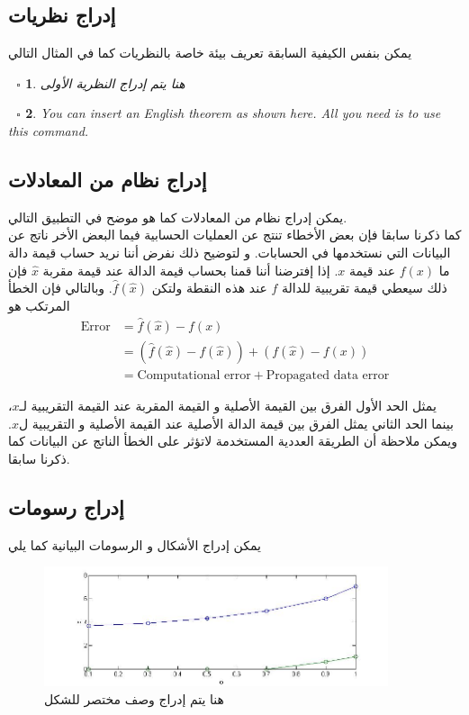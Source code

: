 \documentclass[a4 paper]{report}
\theoremstyle{mystyle}
\newtheorem{theorem}{$\:\:\:\square $ \arabicfonttt{\underline{\large{نظرية}}}}[chapter]
\theoremstyle{Excercises}
\newcommand{\eng}{\textenglish}  %
\begin{document}
\subsection{إدراج نظريات}
يمكن بنفس الكيفية السابقة تعريف بيئة خاصة بالنظريات كما في المثال التالي
\begin{theorem}\label{theorem1}
  هنا يتم إدراج النظرية الأولى
\end{theorem}

\begin{theorem}\label{theorem2}
\eng{You can insert an English theorem as shown here. All you need is to use this command.}
\end{theorem}

\subsection{إدراج نظام من المعادلات}
يمكن إدراج نظام من المعادلات كما هو موضح في التطبيق التالي. \\

كما ذكرنا سابقا فإن بعض الأخطاء تنتج عن العمليات الحسابية فيما البعض الأخر ناتج عن البيانات التي نستخدمها في الحسابات.  و لتوضيح ذلك نفرض أننا نريد حساب قيمة دالة ما $f(x)$ عند قيمة $x$.  إذا إفترضنا أننا قمنا بحساب قيمة الدالة عند قيمة مقربة $\hat{x}$ فإن ذلك سيعطي قيمة تقريبية للدالة $f$ عند هذه النقطة ولتكن $\hat{f}(\hat{x})$. وبالتالي فإن الخطأ المرتكب هو
\begin{align}
  \text{Error} & = \hat{f}(\hat{x})  - f(x) \\
\nonumber                     & = (\hat{f}(\hat{x}) - f(\hat{x}) ) + (f(\hat{x}) -f(x))\\
\nonumber					 & =\text{Computational error} + \text{Propagated data error}
\end{align}

يمثل الحد الأول الفرق بين القيمة الأصلية و القيمة المقربة  عند القيمة التقريبية لـ$x$، بينما الحد الثاني يمثل الفرق بين قيمة الدالة الأصلية عند القيمة الأصلية و التقريبية ل$x$. ويمكن ملاحظة أن الطريقة العددية المستخدمة لاتؤثر على الخطأ الناتج عن البيانات كما ذكرنا سابقا.
\subsection{إدراج رسومات}
يمكن إدراج الأشكال و الرسومات البيانية كما يلي

\begin{figure}[hhh!] %
 \centering
\includegraphics[width=0.9\textwidth]{figure_name.jpg}
\caption{هنا يتم إدراج وصف مختصر للشكل} \label{fig}
\end{figure}
\end{document}
